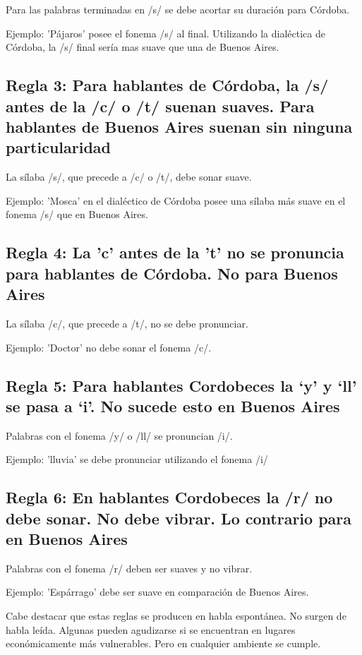 \documentclass[11pt,a4paper,twoside]{tesis}
\begin{document}
Para las palabras terminadas en /s/ se debe acortar su duración para Córdoba. 

Ejemplo: 'Pájaros' posee el fonema /s/ al final. Utilizando la dialéctica de Córdoba, la /s/ final sería mas suave que una de Buenos Aires. 

\subsection*{Regla 3: Para hablantes de Córdoba, la /s/ antes de la /c/ o /t/ suenan suaves. Para hablantes de Buenos Aires suenan sin ninguna particularidad}

La sílaba /s/, que precede a /c/ o /t/, debe sonar suave. 

Ejemplo: 'Mosca' en el dialéctico de Córdoba posee una sílaba más suave en el fonema /s/ que en Buenos Aires. 

\subsection*{Regla 4: La 'c' antes de la 't' no se pronuncia para hablantes de Córdoba. No para Buenos Aires}

La sílaba /c/, que precede a /t/, no se debe pronunciar. 

Ejemplo: 'Doctor' no debe sonar el fonema /c/.

\subsection*{Regla 5: Para hablantes Cordobeces la ‘y’ y ‘ll’ se pasa a ‘i’. No sucede esto en Buenos Aires}

Palabras con el fonema /y/ o /ll/ se pronuncian /i/. 

Ejemplo: 'lluvia' se debe pronunciar utilizando el fonema /i/ 

\subsection*{Regla 6: En hablantes Cordobeces la /r/ no debe sonar. No debe vibrar. Lo contrario para en Buenos Aires}

Palabras con el fonema /r/ deben ser suaves y no vibrar. 

Ejemplo: 'Espárrago' debe ser suave en comparación de Buenos Aires. 

Cabe destacar que estas reglas se producen en habla espontánea. No surgen de habla leída. Algunas pueden agudizarse si se encuentran en lugares económicamente más vulnerables. Pero en cualquier ambiente se cumple.
\end{document}
